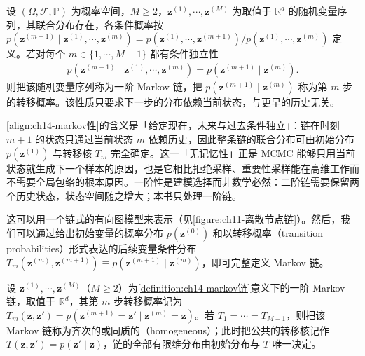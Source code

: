 \documentclass[../../main.tex]{subfiles}
\begin{document}
\begin{definition}[一阶 Markov 链]\label{definition:ch14-markov链}
设 $(\Omega,\mathcal{F},\mathbb{P})$ 为概率空间，$M\geqslant2$，$\bm{z}^{(1)},\cdots,\bm{z}^{(M)}$ 为取值于 $\mathbb{R}^{d}$ 的随机变量序列，其联合分布存在，各条件概率按 $p(\bm{z}^{(m+1)}\mid\bm{z}^{(1)},\cdots,\bm{z}^{(m)})=p(\bm{z}^{(1)},\cdots,\bm{z}^{(m+1)})/p(\bm{z}^{(1)},\cdots,\bm{z}^{(m)})$ 定义。若对每个 $m\in\{1,\cdots,M-1\}$ 都有条件独立性
\begin{align}
p\!\left(\bm{z}^{(m+1)}\mid\bm{z}^{(1)},\cdots,\bm{z}^{(m)}\right)=p\!\left(\bm{z}^{(m+1)}\mid\bm{z}^{(m)}\right).
\label{align:ch14-markov性}
\end{align}
则把该随机变量序列称为一阶 Markov 链，把 $p(\bm{z}^{(m+1)}\mid\bm{z}^{(m)})$ 称为第 $m$ 步的转移概率。该性质只要求下一步的分布依赖当前状态，与更早的历史无关。
\end{definition}

\begin{remark}\eqref{align:ch14-markov性}的含义是「给定现在，未来与过去条件独立」：链在时刻 $m+1$ 的状态只通过当前状态 $m$ 依赖历史，因此整条链的联合分布可由初始分布 $p\!\left(\bm{z}^{(1)}\right)$ 与转移核 $T_{m}$ 完全确定。这一「无记忆性」正是 MCMC 能够只用当前状态就生成下一个样本的原因，也是它相比拒绝采样、重要性采样能在高维工作而不需要全局包络的根本原因。一阶性是建模选择而非数学必然：二阶链需要保留两个历史状态，状态空间随之增大；本书只处理一阶链。
\end{remark}

这可以用一个链式的有向图模型来表示（见\cref{figure:ch11-离散节点链}）。然后，我们可以通过给出初始变量的概率分布 $p\!\left(\bm{z}^{(0)}\right)$ 和以转移概率（transition probabilities）形式表达的后续变量条件分布 $T_{m}\!\left(\bm{z}^{(m)},\bm{z}^{(m+1)}\right)\equiv p\!\left(\bm{z}^{(m+1)}\mid\bm{z}^{(m)}\right)$，即可完整定义 Markov 链。

\begin{definition}[齐次 Markov 链]\label{definition:ch14-齐次markov链}
设 $\bm{z}^{(1)},\cdots,\bm{z}^{(M)}$（$M\geqslant2$）为\cref{definition:ch14-markov链}意义下的一阶 Markov 链，取值于 $\mathbb{R}^{d}$，其第 $m$ 步转移概率记为 $T_{m}(\bm{z},\bm{z}')=p(\bm{z}^{(m+1)}=\bm{z}'\mid\bm{z}^{(m)}=\bm{z})$。若 $T_{1}=\cdots=T_{M-1}$，则把该 Markov 链称为齐次的或同质的（homogeneous）；此时把公共的转移核记作 $T(\bm{z},\bm{z}')=p(\bm{z}'\mid\bm{z})$，链的全部有限维分布由初始分布与 $T$ 唯一决定。
\end{definition}
\end{document}
